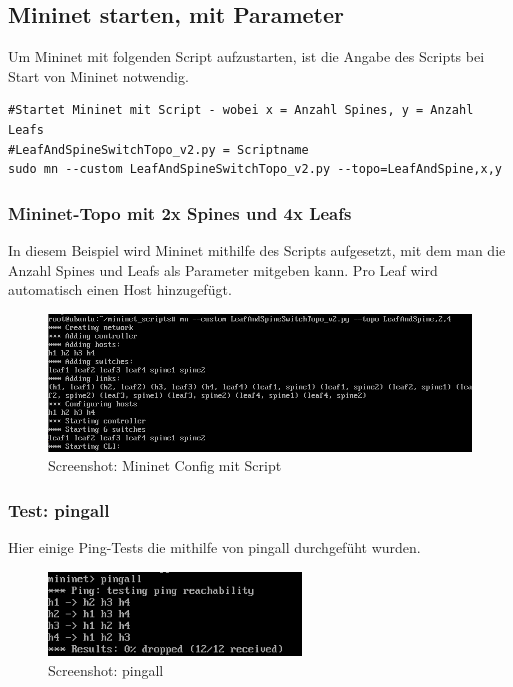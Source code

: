 \documentclass[a4,12pt]{scrartcl}
\begin{document}
\subsection{Mininet starten, mit Parameter}
Um Mininet mit folgenden Script aufzustarten, ist die Angabe des Scripts bei Start von Mininet notwendig. 
\begin{lstlisting}
#Startet Mininet mit Script - wobei x = Anzahl Spines, y = Anzahl Leafs
#LeafAndSpineSwitchTopo_v2.py = Scriptname 
sudo mn --custom LeafAndSpineSwitchTopo_v2.py --topo=LeafAndSpine,x,y 
\end{lstlisting}

\subsubsection{Mininet-Topo mit 2x Spines und 4x Leafs}
In diesem Beispiel wird Mininet mithilfe des Scripts aufgesetzt, mit dem man die Anzahl Spines und Leafs als Parameter mitgeben kann. Pro Leaf wird automatisch einen Host hinzugefügt. 
\begin{figure} [H]
	\begin{center}
	\includegraphics[width=1.00\textwidth]{./pictures/example.png}
	\caption{Screenshot: Mininet Config mit Script}
	\label{x}
	\end{center}
\end{figure} 

\subsubsection{Test: pingall}
Hier einige Ping-Tests die mithilfe von pingall durchgefüht wurden. 
\begin{figure} [H]
	\begin{center}
	\includegraphics[width=0.60\textwidth]{./pictures/example_ping.png}
	\caption{Screenshot: pingall}
	\label{x}
	\end{center}
\end{figure} 
\end{document}
